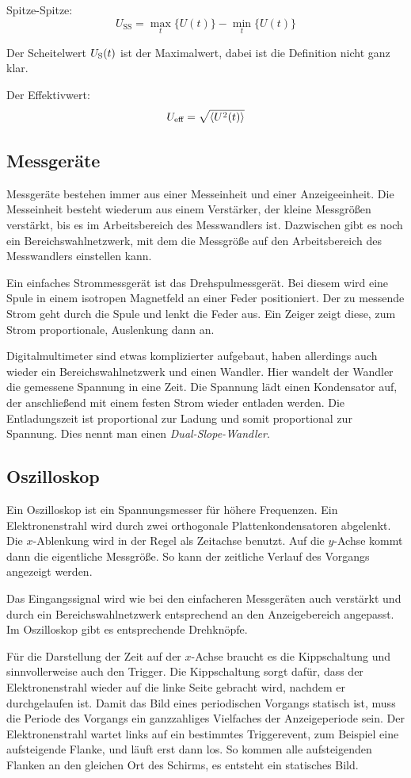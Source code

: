 Spitze-Spitze:
\[
	U_\text{SS} = \max_t \{ U(t) \} - \min_t \{ U(t) \}
\]

Der Scheitelwert $U_\text S(t)$ ist der Maximalwert, dabei ist die Definition
nicht ganz klar.

Der Effektivwert:
\[
	U_\text{eff} = \sqrt{\braket{U^2(t)}}
\]

\subsection{Messgeräte}

Messgeräte bestehen immer aus einer Messeinheit und einer Anzeigeeinheit. Die
Messeinheit besteht wiederum aus einem Verstärker, der kleine Messgrößen
verstärkt, bis es im Arbeitsbereich des Messwandlers ist. Dazwischen gibt es
noch ein Bereichswahlnetzwerk, mit dem die Messgröße auf den Arbeitsbereich des
Messwandlers einstellen kann.

Ein einfaches Strommessgerät ist das Drehspulmessgerät. Bei diesem wird eine
Spule in einem isotropen Magnetfeld an einer Feder positioniert. Der zu
messende Strom geht durch die Spule und lenkt die Feder aus. Ein Zeiger zeigt
diese, zum Strom proportionale, Auslenkung dann an.

Digitalmultimeter sind etwas komplizierter aufgebaut, haben allerdings auch
wieder ein Bereichswahlnetzwerk und einen Wandler. Hier wandelt der Wandler die
gemessene Spannung in eine Zeit. Die Spannung lädt einen Kondensator auf, der
anschließend mit einem festen Strom wieder entladen werden. Die Entladungszeit
ist proportional zur Ladung und somit proportional zur Spannung. Dies nennt man
einen \emph{Dual-Slope-Wandler}.

\subsection{Oszilloskop}

Ein Oszilloskop ist ein Spannungsmesser für höhere Frequenzen. Ein
Elektronenstrahl wird durch zwei orthogonale Plattenkondensatoren abgelenkt. Die
$x$-Ablenkung wird in der Regel als Zeitachse benutzt. Auf die $y$-Achse kommt
dann die eigentliche Messgröße. So kann der zeitliche Verlauf des Vorgangs
angezeigt werden.

Das Eingangssignal wird wie bei den einfacheren Messgeräten auch verstärkt und
durch ein Bereichswahlnetzwerk entsprechend an den Anzeigebereich angepasst. Im
Oszilloskop gibt es entsprechende Drehknöpfe.

Für die Darstellung der Zeit auf der $x$-Achse braucht es die Kippschaltung und
sinnvollerweise auch den Trigger. Die Kippschaltung sorgt dafür, dass der
Elektronenstrahl wieder auf die linke Seite gebracht wird, nachdem er
durchgelaufen ist. Damit das Bild eines periodischen Vorgangs statisch ist,
muss die Periode des Vorgangs ein ganzzahliges Vielfaches der Anzeigeperiode
sein. Der Elektronenstrahl wartet links auf ein bestimmtes Triggerevent, zum
Beispiel eine aufsteigende Flanke, und läuft erst dann los. So kommen alle
aufsteigenden Flanken an den gleichen Ort des Schirms, es entsteht ein
statisches Bild.

